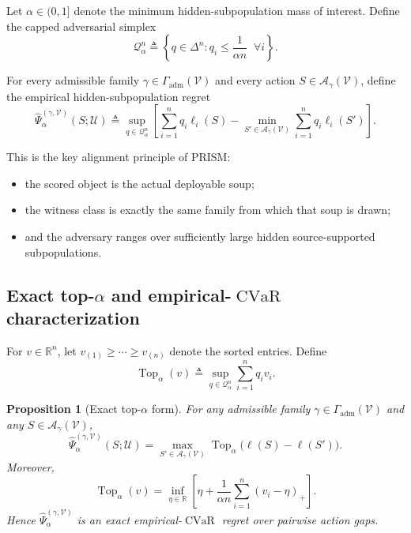 \documentclass{article}
\newtheorem{proposition}{Proposition}
\newcommand{\RR}{\mathbb{R}}
\newcommand{\cA}{\mathcal{A}}
\newcommand{\cQ}{\mathcal{Q}}
\newcommand{\cU}{\mathcal{U}}
\newcommand{\cV}{\mathcal{V}}
\newcommand{\CVaR}{\operatorname{CVaR}}
\newcommand{\Top}{\operatorname{Top}}
\newcommand{\simplex}{\Delta}
\newcommand{\prism}{\textup{\textsc{PRISM}}}
\newcommand{\braces}[1]{\left\{ #1 \right\}}
\newcommand{\bracks}[1]{\left[ #1 \right]}
\newcommand{\loss}{\ell}
\newcommand{\1}{\mathbbm{1}}
\begin{document}
Let \(\alpha\in(0,1]\) denote the minimum hidden-subpopulation mass of interest. Define the capped adversarial simplex
\begin{equation}
    \cQ_\alpha^n
    \triangleq
    \braces{
        q\in\simplex^n :
        q_i \le \frac{1}{\alpha n}
        \;\;\forall i
    }.
    \label{eq:capped_simplex}
\end{equation}

For every admissible family \(\gamma\in\Gamma_{\mathrm{adm}}(\cV)\) and every action \(S\in\cA_\gamma(\cV)\), define the empirical hidden-subpopulation regret
\begin{equation}
    \widehat{\Psi}^{(\gamma,\cV)}_\alpha(S;\cU)
    \triangleq
    \sup_{q\in\cQ_\alpha^n}
    \left[
        \sum_{i=1}^{n} q_i \loss_i(S)
        -
        \min_{S'\in\cA_\gamma(\cV)}
        \sum_{i=1}^{n} q_i \loss_i(S')
    \right].
    \label{eq:family_regret}
\end{equation}

This is the key alignment principle of \prism{}:
\begin{itemize}[leftmargin=1.4em]
    \item the scored object is the actual deployable soup;
    \item the witness class is exactly the same family from which that soup is drawn;
    \item and the adversary ranges over sufficiently large hidden source-supported subpopulations.
\end{itemize}

\subsection{\texorpdfstring{Exact top-\(\alpha\) and empirical-\(\CVaR\) characterization}{Exact top-alpha and empirical-CVaR characterization}}

For \(v\in\RR^n\), let \(v_{(1)}\ge \cdots \ge v_{(n)}\) denote the sorted entries. Define
\begin{equation}
    \Top_\alpha(v)
    \triangleq
    \sup_{q\in\cQ_\alpha^n}\sum_{i=1}^{n}q_i v_i.
    \label{eq:top_alpha_def}
\end{equation}

\begin{proposition}[Exact top-\(\alpha\) form]
\label{prop:top_alpha}
For any admissible family \(\gamma\in\Gamma_{\mathrm{adm}}(\cV)\) and any \(S\in\cA_\gamma(\cV)\),
\begin{equation}
    \widehat{\Psi}^{(\gamma,\cV)}_\alpha(S;\cU)
    =
    \max_{S'\in\cA_\gamma(\cV)}
    \Top_\alpha\!\big(\loss(S)-\loss(S')\big).
    \label{eq:family_top_alpha}
\end{equation}
Moreover,
\begin{equation}
    \Top_\alpha(v)
    =
    \inf_{\eta\in\RR}
    \bracks{
        \eta + \frac{1}{\alpha n}\sum_{i=1}^{n}(v_i-\eta)_+
    }.
    \label{eq:cvar_rep}
\end{equation}
Hence \(\widehat{\Psi}^{(\gamma,\cV)}_\alpha\) is an exact empirical-\(\CVaR\) regret over pairwise action gaps.
\end{proposition}
\end{document}
